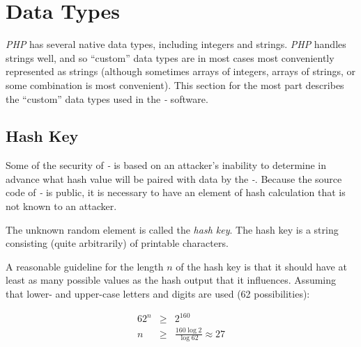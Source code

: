 \section{Data Types}
\label{ctbg0:sdty0}

\emph{PHP} has several native data types, including
integers and strings.  \emph{PHP} handles
strings well, and so ``custom'' data types are
in most cases most conveniently represented as strings (although
sometimes arrays of integers, arrays of strings, or some combination
is most convenient).  This section for the
most part describes the ``custom'' data types 
used in the \emph{\productbasename{}-\productversion{}} software.


\subsection{Hash Key}
\label{ctbg0:sdty0:sthk0}

Some of the 
security of \emph{\productbasename{}-\productversion{}} is based
on an attacker's inability to determine in advance what hash value will
be paired with data by the \emph{\productbasename{}-\productversion{}}.
Because the source code of \emph{\productbasename{}-\productversion{}} is
public, it is necessary to have an element of hash calculation that is not
known to an attacker.

The unknown random element is called the 
\emph{hash key}.  The hash key is a string consisting
(quite arbitrarily) of printable characters.

A reasonable guideline for the length $n$ of the hash key is that it
should have at least as many possible values as the hash output
that it influences.  Assuming that lower- and upper-case letters
and digits are used (62 possibilities):

\begin{eqnarray}
\label{eq:ctbg0:sdty0:sthk0:01} 62^n & \geq & 2^{160} \\
\label{eq:ctbg0:sdty0:sthk0:02} n & \geq & \frac{160 \log 2}{\log 62} \approx 27
\end{eqnarray}


